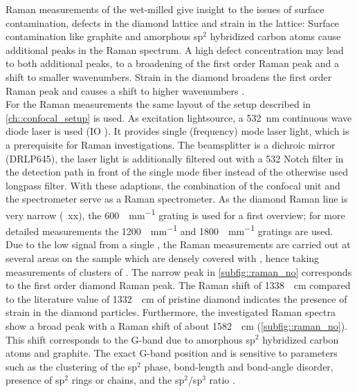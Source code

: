 		Raman measurements of the wet-milled \nds give insight to the issues of surface contamination, defects in the diamond lattice and strain in the lattice:
		Surface contamination like graphite and amorphous sp$^2$ hybridized carbon atoms cause additional peaks in the Raman spectrum.
		A high defect concentration may lead to both additional peaks, to a broadening of the first order Raman peak and a shift to smaller wavenumbers.
		Strain in the diamond broadens the first order Raman peak and causes a shift to higher wavenumbers \cite{Zaitsev2001,Prawer2004,Orwa2000}.
		\\
		For the Raman measurements the same layout of the setup described in \autoref{ch::confocal_setup} is used.
		As excitation lightsource, a \SI{532}{nm} continuous wave diode laser is used (IO ).
		It provides single (frequency) mode laser light, which is a prerequisite for Raman investigations.
		The beamsplitter is a dichroic mirror (DRLP645), the laser light is additionally filtered out with a 532 Notch filter in the detection path in front of the single mode fiber instead of the otherwise used longpass filter.
		With these adaptions, the combination of the confocal unit and the spectrometer serve as a Raman spectrometer.
		As the diamond Raman line is very narrow (~xx), the \SI[per-mode=symbol]{600}{\lines\per\mm} grating is used for a first overview; for more detailed measurements the \SI[per-mode=symbol]{1200}{\lines\per\mm} and \SI[per-mode=symbol]{1800}{\lines\per\mm} gratings are used.
		\\
		Due to the low signal from a single \nd, the Raman measurements are carried out at several areas on the sample \insituS which are densely covered with \nds, hence taking measurements of clusters of \nds.
		The narrow peak in \autoref{subfig::raman_no} corresponds to the first order diamond Raman peak.
		The Raman shift of \SI{1338}{\per\centi\meter} compared to the literature value of \SI{1332}{\per\centi\meter} of pristine diamond \cite{Zaitsev2001} indicates the presence of strain in the diamond particles.
		Furthermore, the investigated Raman spectra show a broad peak with a Raman shift of about \SI{1582}{\per\centi\meter} (\autoref{subfig::raman_no}).
		This shift corresponds to the G-band due to amorphous sp$^2$ hybridized carbon atoms and graphite.
		The exact G-band position and \lw is sensitive to parameters such as the clustering of the sp$^2$ phase, bond-length and bond-angle disorder, presence of sp$^2$ rings or chains, and the sp$^2$/sp$^3$ ratio \cite{Ferrari2004}.
